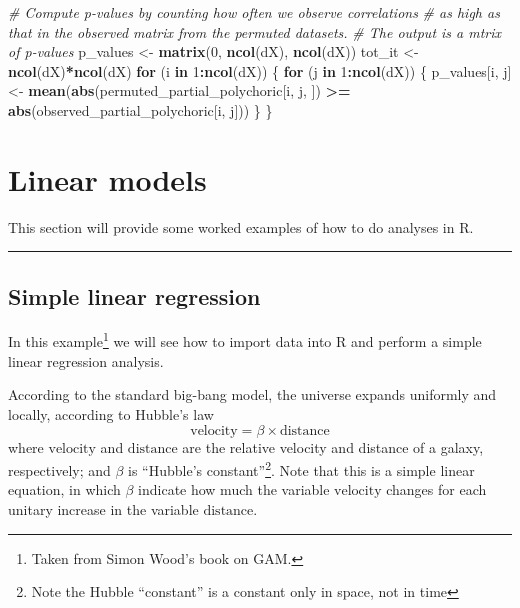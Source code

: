 \documentclass[
]{book}
\newenvironment{Shaded}{\begin{snugshade}}{\end{snugshade}}
\newcommand{\CommentTok}[1]{\textcolor[rgb]{0.56,0.35,0.01}{\textit{#1}}}
\newcommand{\ControlFlowTok}[1]{\textcolor[rgb]{0.13,0.29,0.53}{\textbf{#1}}}
\newcommand{\DecValTok}[1]{\textcolor[rgb]{0.00,0.00,0.81}{#1}}
\newcommand{\FunctionTok}[1]{\textcolor[rgb]{0.13,0.29,0.53}{\textbf{#1}}}
\newcommand{\NormalTok}[1]{#1}
\newcommand{\OtherTok}[1]{\textcolor[rgb]{0.56,0.35,0.01}{#1}}
\newcommand{\SpecialCharTok}[1]{\textcolor[rgb]{0.81,0.36,0.00}{\textbf{#1}}}
\begin{document}
\begin{Shaded}
\begin{Highlighting}[]
\CommentTok{\# Compute p{-}values by counting how often we observe correlations }
\CommentTok{\# as high as that in the observed matrix from the permuted datasets.}
\CommentTok{\# The output is a mtrix of p{-}values}
\NormalTok{p\_values }\OtherTok{\textless{}{-}} \FunctionTok{matrix}\NormalTok{(}\DecValTok{0}\NormalTok{, }\FunctionTok{ncol}\NormalTok{(dX), }\FunctionTok{ncol}\NormalTok{(dX))}
\NormalTok{tot\_it }\OtherTok{\textless{}{-}} \FunctionTok{ncol}\NormalTok{(dX)}\SpecialCharTok{*}\FunctionTok{ncol}\NormalTok{(dX)}
\ControlFlowTok{for}\NormalTok{ (i }\ControlFlowTok{in} \DecValTok{1}\SpecialCharTok{:}\FunctionTok{ncol}\NormalTok{(dX)) \{}
  \ControlFlowTok{for}\NormalTok{ (j }\ControlFlowTok{in} \DecValTok{1}\SpecialCharTok{:}\FunctionTok{ncol}\NormalTok{(dX)) \{}
\NormalTok{    p\_values[i, j] }\OtherTok{\textless{}{-}} \FunctionTok{mean}\NormalTok{(}\FunctionTok{abs}\NormalTok{(permuted\_partial\_polychoric[i, j, ]) }\SpecialCharTok{\textgreater{}=} \FunctionTok{abs}\NormalTok{(observed\_partial\_polychoric[i, j]))}
\NormalTok{  \}}
\NormalTok{\}}
\end{Highlighting}
\end{Shaded}

\chapter{Linear models}\label{linear-models}

This section will provide some worked examples of how to do analyses in R.

\begin{center}\rule{0.5\linewidth}{0.5pt}\end{center}

\section{Simple linear regression}\label{simple-linear-regression}

In this example\footnote{Taken from Simon Wood's book on GAM\citep{wood_gam}.} we will see how to import data into R and perform a simple linear regression analysis.

According to the standard big-bang model, the universe expands uniformly and locally, according to Hubble's law\citep{hubble}
\[
\text{velocity} = \beta \times \text{distance}
\]
where \(\text{velocity}\) and \(\text{distance}\) are the relative velocity and distance of a galaxy, respectively; and \(\beta\) is ``Hubble's constant''\footnote{Note the Hubble ``constant'' is a constant only in space, not in time}. Note that this is a simple linear equation, in which \(\beta\) indicate how much the variable \(\text{velocity}\) changes for each unitary increase in the variable \(\text{distance}\).
\end{document}
